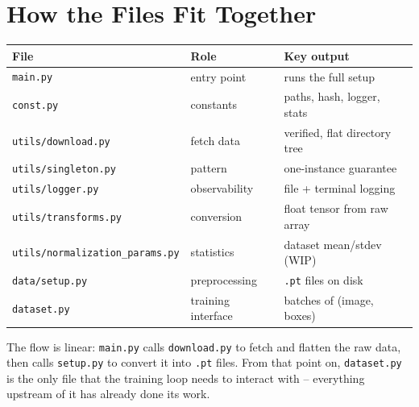 \documentclass[11pt, a4paper]{article}
\begin{document}
\section{How the Files Fit Together}

\begin{center}
  \begin{tabular}{lll}
    \toprule
    \textbf{File}                           & \textbf{Role}      & \textbf{Key output}           \\
    \midrule
    \texttt{main.py}                        & entry point        & runs the full setup           \\
    \texttt{const.py}                       & constants          & paths, hash, logger, stats    \\
    \texttt{utils/download.py}              & fetch data         & verified, flat directory tree \\
    \texttt{utils/singleton.py}             & pattern            & one-instance guarantee        \\
    \texttt{utils/logger.py}                & observability      & file + terminal logging       \\
    \texttt{utils/transforms.py}            & conversion         & float tensor from raw array   \\
    \texttt{utils/normalization\_params.py} & statistics         & dataset mean/stdev (WIP)      \\
    \texttt{data/setup.py}                  & preprocessing      & \texttt{.pt} files on disk    \\
    \texttt{dataset.py}                     & training interface & batches of (image, boxes)     \\
    \bottomrule
  \end{tabular}
\end{center}

The flow is linear: \texttt{main.py} calls \texttt{download.py} to fetch and
flatten the raw data, then calls \texttt{setup.py} to convert it into
\texttt{.pt} files. From that point on, \texttt{dataset.py} is the only file
that the training loop needs to interact with -- everything upstream of it has
already done its work.
\end{document}
